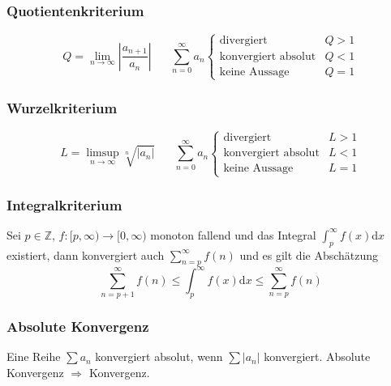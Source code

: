 \documentclass[8pt, a4paper, landscape, fleqn]{scrartcl}
\begin{document}
\begin{multicols*}{3}
				\subsubsection{Quotientenkriterium}
					\vspace{-10pt}
					\begin{equation*}
						Q=\lim_{n\rightarrow \infty} \left \vert\frac{a_{n+1}}{a_n}\right \vert \hspace{20pt} \sum_{n=0}^{\infty}a_n
						\begin{cases}
							\text{divergiert} \hspace{5pt} &Q>1\\
							\text{konvergiert absolut} &Q<1\\
							\text{keine Aussage} &Q=1
						\end{cases}
					\end{equation*}
				\subsubsection{Wurzelkriterium}
					\vspace{-10pt}
					\begin{equation*}
						L=\limsup_{n\rightarrow \infty} \sqrt[n]{\vert a_n \vert} \hspace{20pt} \sum_{n=0}^{\infty}a_n
						\begin{cases}
							\text{divergiert} \hspace{5pt} &L>1\\
							\text{konvergiert absolut} &L<1\\
							\text{keine Aussage} &L=1
						\end{cases}
					\end{equation*}
				\subsubsection{Integralkriterium}
					Sei $p \in \mathbb{Z}$, $f: [p, \infty) \rightarrow [0, \infty)$ monoton fallend und das Integral $\int_{p}^{\infty}f(x)$d$x$ existiert, dann konvergiert auch $\sum_{n=p}^{\infty}f(n)$ und es gilt die Abschätzung
					\begin{equation*}
						\sum_{n=p+1}^{\infty}f(n) \le \int_{p}^{\infty}f(x)\text{d}x \le \sum_{n=p}^{\infty}f(n)
					\end{equation*}	
				\subsubsection{Absolute Konvergenz}
				    Eine Reihe $\sum a_n$ konvergiert absolut, wenn $\sum \vert a_n \vert$ konvergiert. Absolute Konvergenz $\Rightarrow$ Konvergenz.

\end{multicols*}
\end{document}
